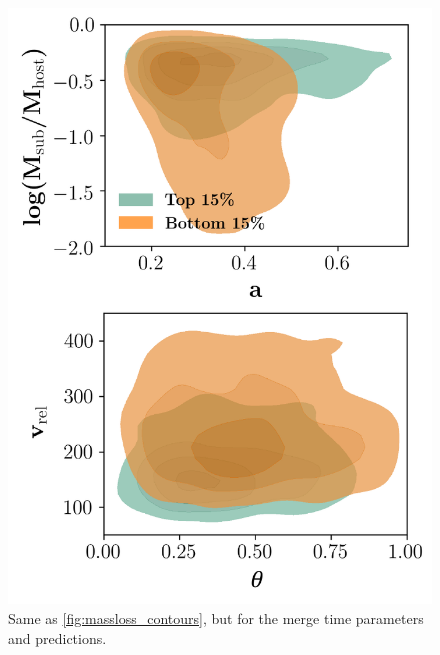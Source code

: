 \documentclass[fleqn,usenatbib]{mnras}
\begin{document}
\begin{figure}
	\includegraphics[width=\columnwidth]{Figures/time_contours}
    \vspace{-20pt}
    \caption{Same as \ref{fig:massloss_contours}, but for the merge time parameters and predictions.}
    \label{fig:time_contours}
\end{figure}
\end{document}
